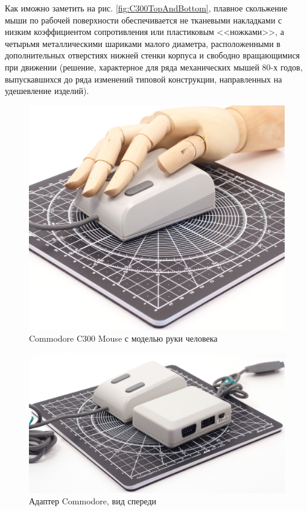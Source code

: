 \documentclass[11pt, a4paper]{article}
\begin{document}
Как иможно заметить на рис. \ref{fig:C300TopAndBottom}, плавное скольжение мыши по рабочей поверхности обеспечивается не тканевыми накладками с низким коэффициентом сопротивления или пластиковым <<ножками>>, а четырьмя металлическими шариками малого диаметра, расположенными в дополнительных отверстиях нижней стенки корпуса и свободно вращающимися при движении (решение, характерное для ряда механических мышей 80-х годов, выпускавшихся до ряда изменений типовой конструкции, направленных на удешевление изделий).

\begin{figure}[h]
    \centering
    \includegraphics[scale=0.3]{1986_commodore_c300_mouse/cmruka_30.jpg}
    \caption{Commodore C300 Mouse с моделью руки человека}
    \label{fig:C300Hand}
\end{figure}

\begin{figure}[h]
    \centering
    \includegraphics[scale=0.3]{1986_commodore_c300_mouse/cmblock_30.jpg}
    \caption{Адаптер Commodore, вид спереди}
    \label{fig:C300Block}
\end{figure}
\end{document}
